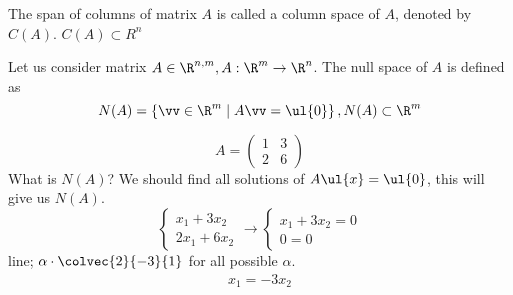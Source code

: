 \begin{definition}
The span of columns of matrix $A$ is called a column space of $A$, denoted by $C(A)$. $C(A)\subset R^n$
\end{definition}
\begin{definition}
Let us consider matrix $A\in\R^{n,m}, A:\R^m\to \R^n$. The null space of $A$ is defined as 
\[
N(A) = \left\{ \vv\in\R^m\mid A\vv = \ul{0}\right\}, N(A)\subset\R^m
\]
\end{definition}
\begin{example}
\[
A = \begin{pmatrix}
1 & 3 \\
2 & 6
\end{pmatrix}
\]	
What is $N(A)$? We should find all solutions of $A\ul{x} = \ul{0}$, this will give us $N(A)$.
\[
\begin{cases}
x_1 + 3x_2\\
2x_1+6x_2
\end{cases} \to\begin{cases}
x_1+3x_2=0\\
0 = 0
\end{cases}\]
line; $\alpha\cdot\colvec{2}{-3}{1}$ for all possible $\alpha$.
\[
\begin{matrix}
x_1 = -3x_2\\
\end{matrix}
\]
\end{example}



